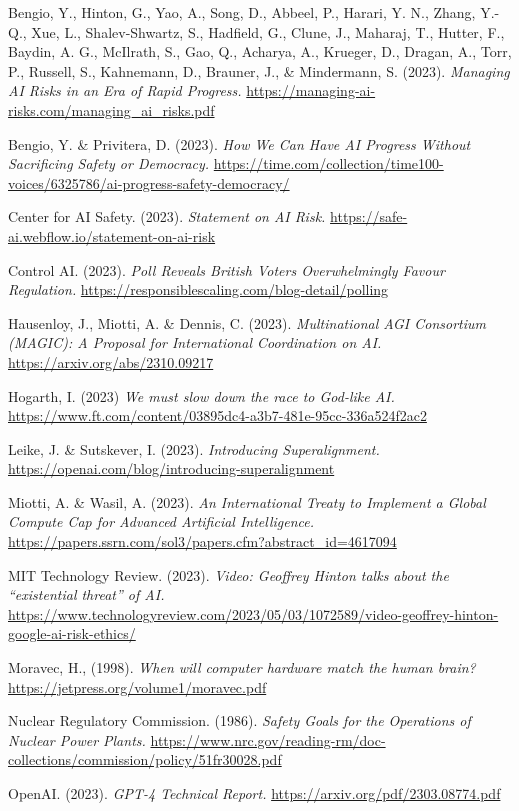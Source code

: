 \documentclass[12pt,a4paper]{article}
\begin{document}
Bengio, Y., Hinton, G., Yao, A., Song, D., Abbeel, P., Harari, Y. N., Zhang, Y.-Q., Xue, L., Shalev-Shwartz, S., Hadfield, G., Clune, J., Maharaj, T., Hutter, F., Baydin, A. G., McIlrath, S., Gao, Q., Acharya, A., Krueger, D., Dragan, A., Torr, P., Russell, S., Kahnemann, D., Brauner, J., \& Mindermann, S. (2023). \textit{Managing AI Risks in an Era of Rapid Progress.} \url{https://managing-ai-risks.com/managing_ai_risks.pdf}

Bengio, Y. \& Privitera, D. (2023). \textit{How We Can Have AI Progress Without Sacrificing Safety or Democracy.} \url{https://time.com/collection/time100-voices/6325786/ai-progress-safety-democracy/}

Center for AI Safety. (2023). \textit{Statement on AI Risk.} \url{https://safe-ai.webflow.io/statement-on-ai-risk}

Control AI. (2023). \textit{Poll Reveals British Voters Overwhelmingly Favour Regulation.} \url{https://responsiblescaling.com/blog-detail/polling}

Hausenloy, J., Miotti, A. \& Dennis, C. (2023). \textit{Multinational AGI Consortium (MAGIC): A Proposal for International Coordination on AI.} \url{https://arxiv.org/abs/2310.09217}

Hogarth, I. (2023) \textit{We must slow down the race to God-like AI.} \url{https://www.ft.com/content/03895dc4-a3b7-481e-95cc-336a524f2ac2}

Leike, J. \& Sutskever, I. (2023). \textit{Introducing Superalignment. }\url{https://openai.com/blog/introducing-superalignment}

Miotti, A. \& Wasil, A. (2023). \textit{An International Treaty to Implement a Global Compute Cap for Advanced Artificial Intelligence.} \url{https://papers.ssrn.com/sol3/papers.cfm?abstract_id=4617094}

MIT Technology Review. (2023). \textit{Video: Geoffrey Hinton talks about the “existential threat” of AI.} \url{https://www.technologyreview.com/2023/05/03/1072589/video-geoffrey-hinton-google-ai-risk-ethics/}

Moravec, H., (1998). \textit{When will computer hardware match the human brain?} \url{https://jetpress.org/volume1/moravec.pdf}

Nuclear Regulatory Commission. (1986). \textit{Safety Goals for the Operations of Nuclear Power Plants.} \url{https://www.nrc.gov/reading-rm/doc-collections/commission/policy/51fr30028.pdf}

OpenAI. (2023). \textit{GPT-4 Technical Report.} \url{https://arxiv.org/pdf/2303.08774.pdf}
\end{document}
